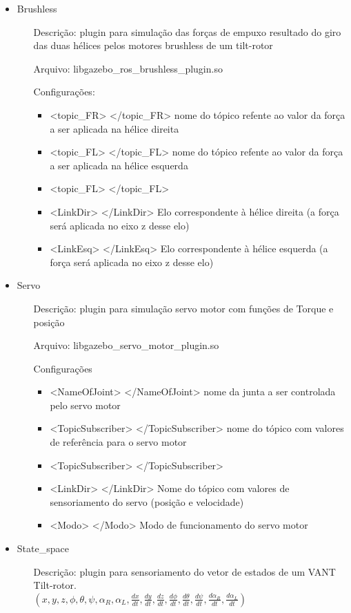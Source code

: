 \begin{itemize}
\item Brushless
\begin{itemize}
\item[Descrição:] plugin para simulação das forças de empuxo resultado do giro das duas hélices pelos motores brushless de um tilt-rotor
\item[Arquivo:] libgazebo\_ros\_brushless\_plugin.so
\item[Configurações:]
\begin{itemize}
\item <topic\_FR> </topic\_FR> nome do tópico refente ao valor da força a ser aplicada na hélice direita
\item <topic\_FL> </topic\_FL> nome do tópico refente ao valor da força a ser aplicada na hélice esquerda
\item <topic\_FL> </topic\_FL>
\item <LinkDir> </LinkDir> Elo correspondente à hélice direita (a força será aplicada no eixo z desse elo)
\item <LinkEsq> </LinkEsq> Elo correspondente à hélice esquerda (a força será aplicada no eixo z desse elo)
\end{itemize}
\end{itemize}
\item Servo
\begin{itemize}
\item[Descrição:] plugin para simulação servo motor com funções de Torque e posição
\item[Arquivo:] libgazebo\_servo\_motor\_plugin.so
\item[Configurações]
\begin{itemize}
\item <NameOfJoint> </NameOfJoint> nome da junta a ser controlada pelo servo motor
\item <TopicSubscriber> </TopicSubscriber> nome do tópico com valores de referência para o servo motor
\item <TopicSubscriber> </TopicSubscriber>
\item <LinkDir> </LinkDir> Nome do tópico com valores de sensoriamento do servo (posição e velocidade)
\item <Modo> </Modo> Modo de funcionamento do servo motor
\end{itemize}
\end{itemize}
\item State\_space
\begin{itemize}
\item[Descrição:] plugin para sensoriamento do vetor de estados de um VANT Tilt-rotor. \\ $(x,y,z, \phi,\theta,\psi,\alpha_R,\alpha_L,\frac{dx}{dt},\frac{dy}{dt},\frac{dz}{dt}, \frac{d\phi}{dt},\frac{d\theta}{dt},\frac{d\psi}{dt},\frac{d\alpha_R}{dt},\frac{d\alpha_L}{dt})$

\end{itemize}
\end{itemize}
